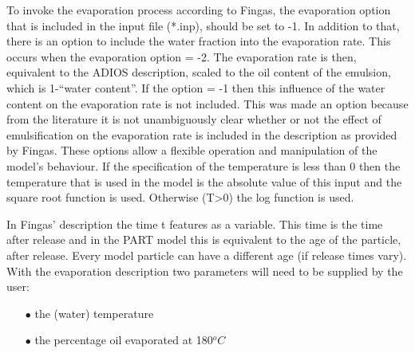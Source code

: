 \documentclass[english]{deltares_manual}
\begin{document}
To invoke the evaporation process according to Fingas, the evaporation option that is included in the input file (*.inp), should be set to -1.  In addition to that, there is an option to include the water fraction into the evaporation rate. This occurs when the evaporation option = -2. The evaporation rate is then, equivalent to the ADIOS description, scaled to the oil content of the emulsion, which is 1-“water content”. If the option = -1 then this influence of the water content on the evaporation rate is not included. This was made an option because from the literature it is not unambiguously clear whether or not the effect of emulsification on the evaporation rate is included in the description as provided by Fingas. These options allow a flexible operation and manipulation of the model’s behaviour. If the specification of the temperature is less than 0 then the temperature that is used in the model is the absolute value of this input and the square root function is used. Otherwise (T>0) the log function is used.

In Fingas’ description the time t features as a variable. This time is the time after release and in the PART model this is equivalent to the age of the particle, after release. Every model particle can have a different age (if release times vary). With the evaporation description two parameters will need to be supplied by the user:
\begin{itemize}
	\item[$\bullet$] the (water) temperature
	\item[$\bullet$] the percentage oil evaporated at 180$^{o}C$
\end{itemize}
\end{document}
